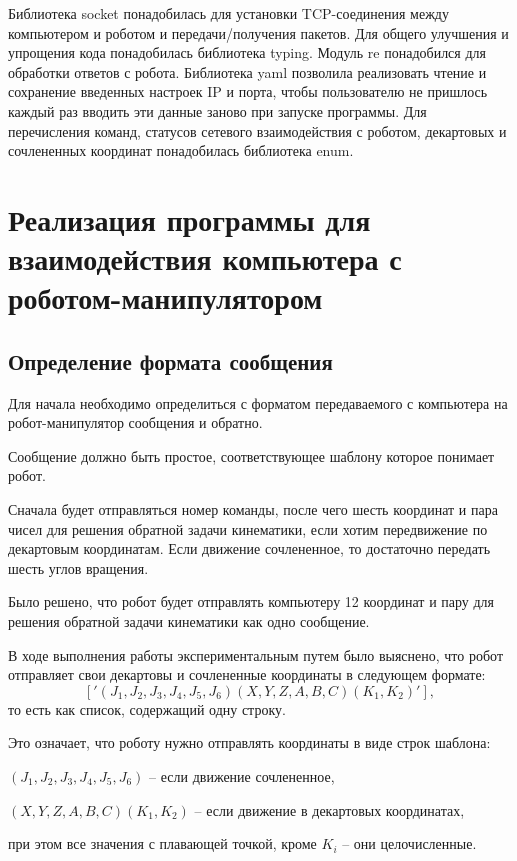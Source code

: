 \documentclass[a4paper,14pt]{extarticle}
\begin{document}
Библиотека socket понадобилась для установки TCP-соединения между компьютером и роботом
и передачи/получения пакетов. Для общего улучшения и упрощения кода понадобилась
библиотека typing. Модуль re понадобился для обработки ответов с робота. Библиотека
yaml позволила реализовать чтение и сохранение введенных настроек IP и порта, чтобы
пользователю не пришлось каждый раз вводить эти данные заново при запуске программы.
Для перечисления команд, статусов сетевого взаимодействия с роботом,
декартовых и сочлененных координат понадобилась библиотека enum.


\section{Реализация программы для взаимодействия компьютера с роботом-манипулятором}
\subsection{Определение формата сообщения}
Для начала необходимо определиться
с форматом передаваемого с компьютера
на робот-манипулятор сообщения и обратно.


Сообщение должно быть простое, соответствующее
шаблону которое понимает робот.


Сначала будет отправляться номер команды, после чего
шесть координат и пара чисел для решения
обратной задачи кинематики, если хотим
передвижение по декартовым координатам.
Если движение сочлененное, то достаточно
передать шесть углов вращения.


Было решено, что робот будет отправлять компьютеру
12 координат и пару для решения обратной задачи кинематики
как одно сообщение.


В ходе выполнения работы экспериментальным путем было выяснено, что
робот отправляет свои декартовы и сочлененные координаты
в следующем формате:
$$
['(J_1,J_2,J_3,J_4,J_5,J_6)(X,Y,Z,A,B,C)(K_1,K_2)'],
$$
то есть как список, содержащий одну строку.


Это означает, что роботу нужно отправлять
координаты в виде строк шаблона:
\begin{compactitem}
    \item $(J_1,J_2,J_3,J_4,J_5,J_6)$ -- если движение сочлененное,
    \item $(X,Y,Z,A,B,C)(K_1,K_2)$ -- если движение в декартовых координатах,
\end{compactitem}
при этом все значения с плавающей точкой, кроме $K_i$ -- они целочисленные.
\end{document}
